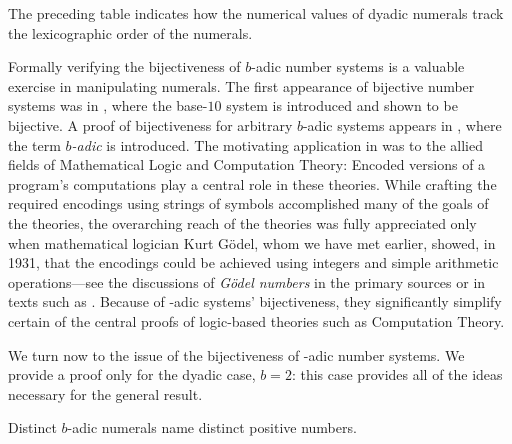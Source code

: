 \medskip

\noindent
The preceding table indicates how the numerical values of dyadic numerals track the lexicographic order of the numerals.

\bigskip

  
Formally verifying the bijectiveness of $b$-adic number systems is a valuable exercise in manipulating numerals.  The first appearance of bijective number systems was in \cite{Foster47}, where the base-$10$ system is introduced and shown to be bijective.  A proof of
bijectiveness for arbitrary $b$-adic systems appears in \cite{Smullyan61}, where the term {\em $b$-adic} is introduced.  The motivating application in \cite{Smullyan61} was to the allied fields
of Mathematical Logic and Computation Theory: Encoded versions of a program's computations play a central role in these theories.  While crafting the required encodings using strings of symbols accomplished many of the goals of the theories, the overarching reach of the theories was fully appreciated only when mathematical logician Kurt G\"{o}del, whom we have met earlier, showed, in 1931, that the encodings could be achieved using integers and simple arithmetic operations---see the discussions of {\it G\"{o}del numbers} in the primary sources
\cite{Goedel31,Turing36} or in texts such as \cite{Rosenberg12}.  Because of -adic systems' bijectiveness, they significantly simplify certain of the central proofs of logic-based theories such as Computation Theory.

\medskip

We turn now to the issue of the bijectiveness of -adic number systems.  We provide a proof only for the dyadic case, $b = 2$: this case provides all of the ideas necessary for the general result.

\begin{prop}
\label{thm:adic-bijective}
Distinct $b$-adic numerals name distinct positive numbers.
\end{prop}

